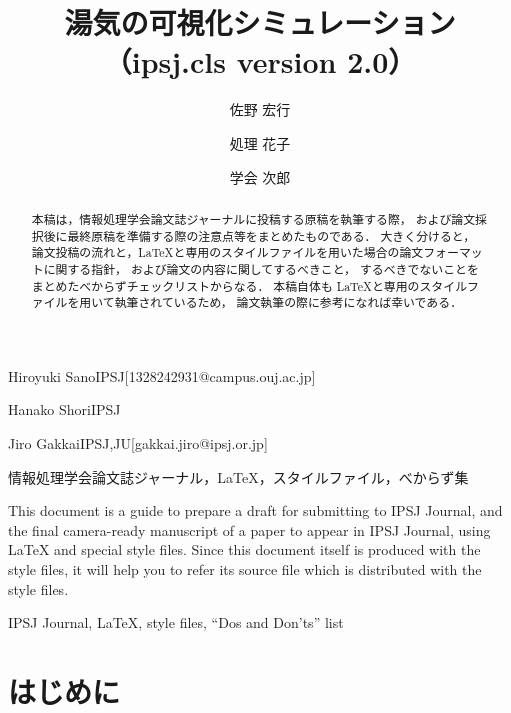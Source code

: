 \documentclass[submit]{ipsj}
\begin{document}
\title{湯気の可視化シミュレーション\\
（ipsj.cls version 2.0）}





\author{佐野 宏行}{Hiroyuki Sano}{IPSJ}[1328242931@campus.ouj.ac.jp]
\author{処理 花子}{Hanako Shori}{IPSJ}
\author{学会 次郎}{Jiro Gakkai}{IPSJ,JU}[gakkai.jiro@ipsj.or.jp]

\begin{abstract}
本稿は，情報処理学会論文誌ジャーナルに投稿する原稿を執筆する際，
および論文採択後に最終原稿を準備する際の注意点等をまとめたものである．
大きく分けると，
論文投稿の流れと，\LaTeX と専用のスタイルファイルを用いた場合の論文フォーマットに関する指針，
および論文の内容に関してするべきこと，
するべきでないことをまとめたべからずチェックリストからなる．
本稿自体も \LaTeX と専用のスタイルファイルを用いて執筆されているため，
論文執筆の際に参考になれば幸いである．
\end{abstract}


\begin{jkeyword}
情報処理学会論文誌ジャーナル，\LaTeX，スタイルファイル，べからず集
\end{jkeyword}

\begin{eabstract}
This document is a guide to prepare a draft for submitting to IPSJ
Journal, and the final camera-ready manuscript of a paper to appear in
IPSJ Journal, using {\LaTeX} and special style files.  Since this
document itself is produced with the style files, it will help you to
refer its source file which is distributed with the style files.
\end{eabstract}

\begin{ekeyword}
IPSJ Journal, \LaTeX, style files, ``Dos and Don'ts'' list
\end{ekeyword}

\maketitle

\section{はじめに}
\end{document}
